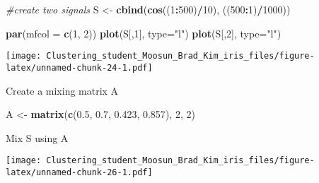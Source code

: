 \documentclass[11pt,]{article}
\newenvironment{Shaded}{\begin{snugshade}}{\end{snugshade}}
\newcommand{\CommentTok}[1]{\textcolor[rgb]{0.56,0.35,0.01}{\textit{#1}}}
\newcommand{\DataTypeTok}[1]{\textcolor[rgb]{0.13,0.29,0.53}{#1}}
\newcommand{\DecValTok}[1]{\textcolor[rgb]{0.00,0.00,0.81}{#1}}
\newcommand{\FloatTok}[1]{\textcolor[rgb]{0.00,0.00,0.81}{#1}}
\newcommand{\KeywordTok}[1]{\textcolor[rgb]{0.13,0.29,0.53}{\textbf{#1}}}
\newcommand{\NormalTok}[1]{#1}
\newcommand{\OperatorTok}[1]{\textcolor[rgb]{0.81,0.36,0.00}{\textbf{#1}}}
\newcommand{\StringTok}[1]{\textcolor[rgb]{0.31,0.60,0.02}{#1}}
\begin{document}
\begin{Shaded}
\begin{Highlighting}[]
\CommentTok{#create two signals}
\NormalTok{S <-}\StringTok{ }\KeywordTok{cbind}\NormalTok{(}\KeywordTok{cos}\NormalTok{((}\DecValTok{1}\OperatorTok{:}\DecValTok{500}\NormalTok{)}\OperatorTok{/}\DecValTok{10}\NormalTok{), ((}\DecValTok{500}\OperatorTok{:}\DecValTok{1}\NormalTok{)}\OperatorTok{/}\DecValTok{1000}\NormalTok{))}

\KeywordTok{par}\NormalTok{(}\DataTypeTok{mfcol =} \KeywordTok{c}\NormalTok{(}\DecValTok{1}\NormalTok{, }\DecValTok{2}\NormalTok{))}
\KeywordTok{plot}\NormalTok{(S[,}\DecValTok{1}\NormalTok{], }\DataTypeTok{type=}\StringTok{"l"}\NormalTok{)}
\KeywordTok{plot}\NormalTok{(S[,}\DecValTok{2}\NormalTok{], }\DataTypeTok{type=}\StringTok{"l"}\NormalTok{)}
\end{Highlighting}
\end{Shaded}

\texttt{[image: Clustering\_student\_Moosun\_Brad\_Kim\_iris\_files/figure-latex/unnamed-chunk-24-1.pdf]}

Create a mixing matrix A

\begin{Shaded}
\begin{Highlighting}[]
\NormalTok{A <-}\StringTok{ }\KeywordTok{matrix}\NormalTok{(}\KeywordTok{c}\NormalTok{(}\FloatTok{0.5}\NormalTok{, }\FloatTok{0.7}\NormalTok{, }\FloatTok{0.423}\NormalTok{, }\FloatTok{0.857}\NormalTok{), }\DecValTok{2}\NormalTok{, }\DecValTok{2}\NormalTok{)}
\end{Highlighting}
\end{Shaded}

Mix S using A

\begin{Shaded}
\end{Shaded}

\texttt{[image: Clustering\_student\_Moosun\_Brad\_Kim\_iris\_files/figure-latex/unnamed-chunk-26-1.pdf]}
\end{document}
